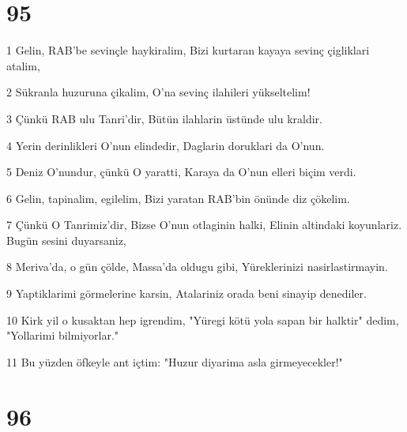 \chapter{95}

\par 1 Gelin, RAB'be sevinçle haykiralim, Bizi kurtaran kayaya sevinç çigliklari atalim,
\par 2 Sükranla huzuruna çikalim, O'na sevinç ilahileri yükseltelim!
\par 3 Çünkü RAB ulu Tanri'dir, Bütün ilahlarin üstünde ulu kraldir.
\par 4 Yerin derinlikleri O'nun elindedir, Daglarin doruklari da O'nun.
\par 5 Deniz O'nundur, çünkü O yaratti, Karaya da O'nun elleri biçim verdi.
\par 6 Gelin, tapinalim, egilelim, Bizi yaratan RAB'bin önünde diz çökelim.
\par 7 Çünkü O Tanrimiz'dir, Bizse O'nun otlaginin halki, Elinin altindaki koyunlariz. Bugün sesini duyarsaniz,
\par 8 Meriva'da, o gün çölde, Massa'da oldugu gibi, Yüreklerinizi nasirlastirmayin.
\par 9 Yaptiklarimi görmelerine karsin, Atalariniz orada beni sinayip denediler.
\par 10 Kirk yil o kusaktan hep igrendim, "Yüregi kötü yola sapan bir halktir" dedim, "Yollarimi bilmiyorlar."
\par 11 Bu yüzden öfkeyle ant içtim: "Huzur diyarima asla girmeyecekler!"

\chapter{96}

